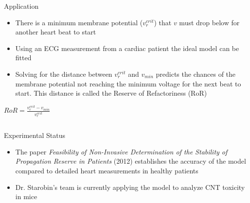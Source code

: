 \documentclass[final,hyperref={pdfpagelabels=false}]{beamer}
\begin{document}
\begin{frame}{}
    \begin{columns}
        \begin{column}{.98\linewidth}
            \begin{block}{Application}
                \centering
                \begin{itemize}
                    \item There is a minimum membrane potential (\(v_{r}^{crit}\)) that \(v\) must drop below for another heart beat to start
                    \item Using an ECG measurement from a cardiac patient the ideal model can be fitted
                    \item Solving for the distance between \(v_r^{crit}\) and \(v_{min}\) predicts the chances of the membrane potential 
                        not reaching the minimum voltage for the next beat to start. This distance is called the Reserve 
                        of Refactoriness (RoR) \\[2ex]
                \end{itemize}
                \(RoR=\frac{v_r^{crit}-v_{min}}{v_r^{crit}}\)
            \end{block}
        \end{column}
    \end{columns}

    \begin{columns}
        \begin{column}{.98\linewidth}
            \begin{block}{Experimental Status}
                \centering
                \begin{itemize}
                    \item The paper \textit{Feasibility of Non-Invasive Determination of the Stability of Propagation Reserve in Patients} 
                        (2012) establishes the accuracy of the model compared to detailed heart measurements in healthy patients
                    \item Dr. Starobin's team is currently applying the model to analyze CNT toxicity in mice
                \end{itemize}
            \end{block}
        \end{column}
    \end{columns}
  \end{frame}
\end{document}
